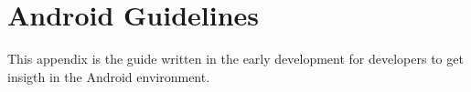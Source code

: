\chapter{Android Guidelines}
\label{app:android_guidelines}

This appendix is the guide written in the early development for developers to get insigth in the Android environment.

